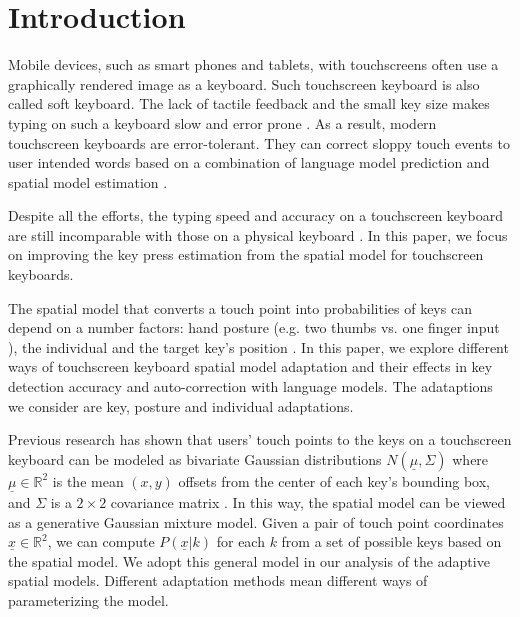 \documentclass{sigchi}
\begin{document}
\section{Introduction}
Mobile devices, such as smart phones and tablets, with touchscreens often use
a graphically rendered image as a keyboard. Such touchscreen keyboard is also called
soft keyboard. The lack of tactile feedback and the small key size makes typing on
such a keyboard slow and error prone \cite{Brewster:2007, Rabin:2004}.
As a result, modern touchscreen keyboards are error-tolerant. They can correct sloppy touch
events to user intended words based on a combination of language model prediction 
and spatial model estimation \cite{AlFaraj:2009, Aulagner:2010, Goodman:2002, Gunawardana:2010}. 

Despite all the efforts, the typing speed and accuracy on a touchscreen keyboard are
still incomparable with those on a physical keyboard \cite{Hoggan:2008}. In this paper,
we focus on improving the key press estimation from the spatial model for touchscreen
keyboards. 

The spatial model that converts a touch point into probabilities of keys 
can depend on a number factors: hand posture (e.g. two thumbs vs. one finger input \cite{Azenkot:2012}), 
the individual \cite{Findlater:2012} and the target key's position \cite{Azenkot:2012}.
In this paper, we explore different ways of touchscreen keyboard spatial model adaptation and
their effects in key detection accuracy and auto-correction with language
models. The adataptions we consider are key, posture and individual adaptations. 

Previous research has shown that users' touch points to the keys on a touchscreen
keyboard can be modeled as bivariate Gaussian distributions $N(\underline\mu, \Sigma)$
where $\underline\mu \in \mathbb{R}^2$ is the mean $(x, y)$ offsets from the center of
each key's bounding box, and $\Sigma$ is a $2\times 2$ covariance matrix  
\cite{Azenkot:2012, Goodman:2002, Rashid:2008}.
In this way, the spatial model can be viewed as a generative Gaussian mixture
model.  Given a pair of touch point coordinates $\underline x \in \mathbb{R}^2$, we can compute
$P(\underline x | k)$ for each $k$ from a set of possible keys based on the spatial model.
We adopt this general model in our analysis of the adaptive spatial models.
Different adaptation methods mean different ways of parameterizing the model.
\end{document}
